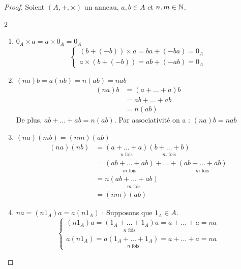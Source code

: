 \begin{footnotesize}
    \begin{proof} 
        Soient $(A,+,\times)$ un anneau, $a,b \in A$ et $n,m \in \mathbb{N}$. 
        \begin{multicols*}{2}
        \begin{enumerate}[label=\roman*)]
            \item ${0_A \times a = a \times 0_A = 0_A}$ 
                \[
                    \begin{cases}
                        (b + (-b)) \times a = ba + (-ba) = 0_A \\ 
                        a \times (b + (-b)) = ab + (-ab) = 0_A
                    \end{cases}
                \]
            \item ${(na)b = a(nb) = n(ab) = nab}$
                    \begin{align*}
                        (na)b &= (a + \dots + a) b \\ 
                                &= ab +\dots + ab \\ 
                                &= n(ab)
                    \end{align*}
                    De plus, $ab + \dots + ab = n(ab)$. Par associativité on a : $(na)b = nab$  
            \columnbreak
            \item ${(na)(mb) = (nm)(ab)}$
                    \begin{align*}
                        (na)(nb) &= \underset{n\text{ fois}}{(a + \dots + a)} \underset{m\text{ fois}}{(b + \dots + b)} \\ 
                                    &= \underset{m\text{ fois}}{(ab + \dots + ab)} + \dots + \underset{m\text{ fois}}{(ab + \dots + ab)} \\ 
                                    &= n \underset{m \text{ fois}}{(ab + \dots + ab)} \\ 
                                    &= (nm)(ab)
                    \end{align*}
            \item $na = (n1_A)a = a(n1_A)$ : Supposons que $1_A \in A$. 
                    \[
                        \begin{cases}
                            (n1_A)a = \underset{n\text{ fois}}{(1_A + \dots + 1_A)} a = a + \dots + a = na \\ 
                            a(n1_A) = a \underset{n\text{ fois}}{(1_A + \dots + 1_A)} = a + \dots + a = na
                        \end{cases}
                    \]
        \end{enumerate}
        \end{multicols*}
    \end{proof}
\end{footnotesize}

